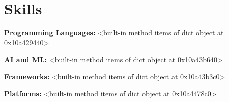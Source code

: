 \section{Skills}

    \begin{onecolentry}
        \textbf{Programming Languages:} <built-in method items of dict object at 0x10a429440>
    \end{onecolentry}

    \vspace{0.05 cm}

    \begin{onecolentry}
        \textbf{AI and ML:} <built-in method items of dict object at 0x10a43b640>
    \end{onecolentry}

    \vspace{0.05 cm}

    \begin{onecolentry}
        \textbf{Frameworks:} <built-in method items of dict object at 0x10a43b3c0>
    \end{onecolentry}

    \vspace{0.05 cm}

    \begin{onecolentry}
        \textbf{Platforms:} <built-in method items of dict object at 0x10a4478c0>
    \end{onecolentry}

    \vspace{0.05 cm}

